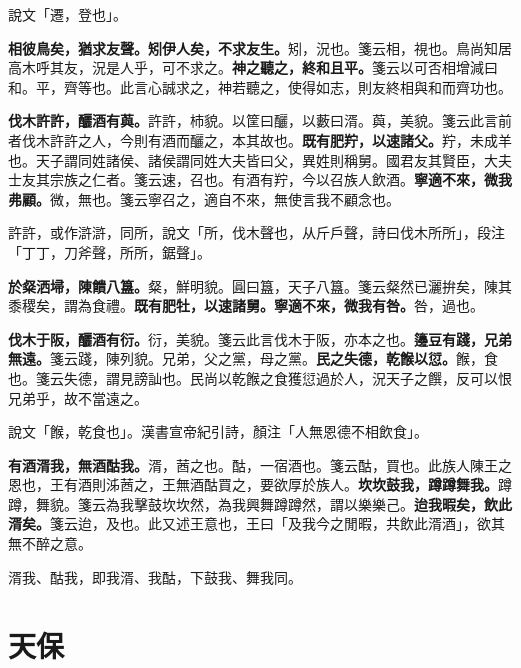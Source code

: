 \begin{quoting}說文「遷，登也」。\end{quoting}

\textbf{相彼鳥矣，猶求友聲。矧伊人矣，不求友生。}{\footnotesize 矧，況也。箋云相，視也。鳥尚知居高木呼其友，況是人乎，可不求之。}\textbf{神之聽之，終和且平。}{\footnotesize 箋云以可否相增減曰和。平，齊等也。此言心誠求之，神若聽之，使得如志，則友終相與和而齊功也。}

\textbf{伐木許許，釃酒有藇。}{\footnotesize 許許，杮貌。以筐曰釃，以藪曰湑。藇，美貌。箋云此言前者伐木許許之人，今則有酒而釃之，本其故也。}\textbf{既有肥羜，以速諸父。}{\footnotesize 羜，未成羊也。天子謂同姓諸侯、諸侯謂同姓大夫皆曰父，異姓則稱舅。國君友其賢臣，大夫士友其宗族之仁者。箋云速，召也。有酒有羜，今以召族人飲酒。}\textbf{寧適不來，微我弗顧。}{\footnotesize 微，無也。箋云寧召之，適自不來，無使言我不顧念也。}

\begin{quoting}許許，或作滸滸，同所，說文「所，伐木聲也，从斤戶聲，詩曰伐木所所」，段注「丁丁，刀斧聲，所所，鋸聲」。\end{quoting}

\textbf{於粲洒埽，陳饋八簋。}{\footnotesize 粲，鮮明貌。圓曰簋，天子八簋。箋云粲然已灑拚矣，陳其黍稷矣，謂為食禮。}\textbf{既有肥牡，以速諸舅。寧適不來，微我有咎。}{\footnotesize 咎，過也。}

\textbf{伐木于阪，釃酒有衍。}{\footnotesize 衍，美貌。箋云此言伐木于阪，亦本之也。}\textbf{籩豆有踐，兄弟無遠。}{\footnotesize 箋云踐，陳列貌。兄弟，父之黨，母之黨。}\textbf{民之失德，乾餱以愆。}{\footnotesize 餱，食也。箋云失德，謂見謗訕也。民尚以乾餱之食獲愆過於人，況天子之饌，反可以恨兄弟乎，故不當遠之。}

\begin{quoting}說文「餱，乾食也」。漢書宣帝紀引詩，顏注「人無恩德不相飲食」。\end{quoting}

\textbf{有酒湑我，無酒酤我。}{\footnotesize 湑，莤之也。酤，一宿酒也。箋云酤，買也。此族人陳王之恩也，王有酒則泲莤之，王無酒酤買之，要欲厚於族人。}\textbf{坎坎鼓我，蹲蹲舞我。}{\footnotesize 蹲蹲，舞貌。箋云為我擊鼓坎坎然，為我興舞蹲蹲然，謂以樂樂己。}\textbf{迨我暇矣，飲此湑矣。}{\footnotesize 箋云迨，及也。此又述王意也，王曰「及我今之閒暇，共飲此湑酒」，欲其無不醉之意。}

\begin{quoting}湑我、酤我，即我湑、我酤，下鼓我、舞我同。\end{quoting}

\section{天保}

